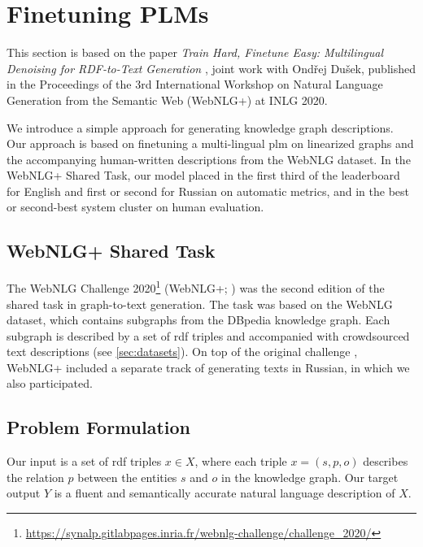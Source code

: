\section{Finetuning PLMs}
\label{sec:finetuning}

\begin{refbox}
    This section is based on the paper \emph{Train Hard, Finetune Easy: Multilingual Denoising for RDF-to-Text Generation} \cite{kasnerTrainHardFinetune2020}, joint work with Ondřej Dušek, published in the Proceedings of the 3rd International Workshop on Natural Language Generation from the Semantic Web (WebNLG+) at INLG 2020.
\end{refbox}


We introduce a simple approach for generating knowledge graph descriptions. Our approach is based on finetuning a multi-lingual \ac{plm} on linearized graphs and the accompanying human-written descriptions from the WebNLG dataset. In the WebNLG+ Shared Task, our model placed in the first third of the leaderboard for English and first or second for Russian on automatic metrics, and in the best or second-best system cluster on human evaluation.

\subsection{WebNLG+ Shared Task}
\label{sec:webnlgp}
The WebNLG Challenge 2020\footnote{\url{https://synalp.gitlabpages.inria.fr/webnlg-challenge/challenge_2020/}} (WebNLG+; \citealp{ferreira20202020}) was the second edition of the shared task in graph-to-text generation. The task was based on the WebNLG dataset, which contains subgraphs from the DBpedia knowledge graph. Each subgraph is described by a set of \ac{rdf} triples and accompanied with crowdsourced text descriptions (see \autoref{sec:datasets}). On top of the original challenge \cite{gardentWebNLGChallengeGenerating2017}, WebNLG+ included a separate track of generating texts in Russian, in which we also participated.


\subsection{Problem Formulation}
\label{sec:mbart}
Our input is a set of \ac{rdf} triples $x \in X$, where each triple $x = (s, p, o)$ describes the relation $p$ between the entities $s$ and $o$ in the knowledge graph. Our target output $Y$ is a fluent and semantically accurate natural language description of $X$.


